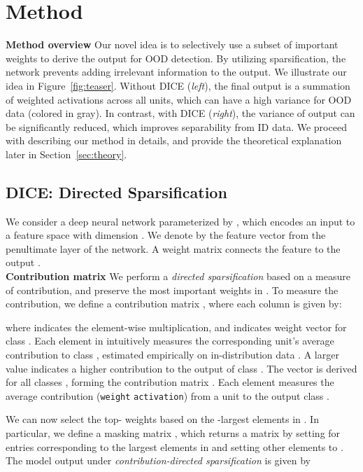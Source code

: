 \documentclass[runningheads]{llncs}
\begin{document}
\section{Method}
\label{sec:method}

\noindent \textbf{Method overview} Our novel idea is to selectively use a subset of important weights to derive the output for OOD detection. By utilizing sparsification, the network prevents adding irrelevant information to the output. We illustrate our idea in Figure~\ref{fig:teaser}. Without DICE (\emph{left}), the final output is a summation of weighted activations across all units, which can have a high variance for OOD data (colored in gray). In contrast, with DICE (\emph{right}), the variance of output can be significantly reduced, which improves separability from ID data. We proceed with describing our method in details, and provide the theoretical explanation later in Section~\ref{sec:theory}.


\subsection{DICE: Directed Sparsification}
\label{sec:dks}
We consider a deep neural network parameterized by , which encodes an input  to a feature space with dimension . We denote by  the feature vector from the penultimate layer of the network.
A weight matrix  connects the feature  to the output . \\

\noindent \textbf{Contribution matrix} We perform a \emph{directed sparsification} based on a measure of contribution, and preserve the most important weights in . To measure the contribution, we define a contribution matrix , where each column  is given by:

where  indicates the element-wise multiplication, and  indicates weight vector for class . Each element in  intuitively measures the corresponding unit's average contribution to class , estimated empirically on in-distribution data . A larger value indicates a higher contribution to the output  of class . The vector  is derived for all classes  , forming the contribution matrix . Each element  measures the average contribution (\texttt{weight}  \texttt{activation}) from a unit  to the output class . 

We can now select the top- weights based on the -largest elements in .  In particular, we define a masking matrix , which returns a matrix by setting  for entries corresponding to the  largest elements in  and setting other elements to .
The model output under \emph{contribution-directed sparsification} is given by
\end{document}
